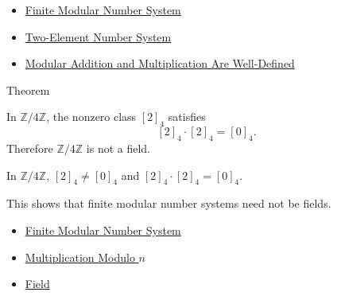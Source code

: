 \begin{dependencies}
\begin{itemize}
  \item \hyperref[def:finite-modular-number-system]{Finite Modular Number System}
  \item \hyperref[def:two-element-number-system]{Two-Element Number System}
  \item \hyperref[thm:modular-operations-well-defined]{Modular Addition and Multiplication Are Well-Defined}
\end{itemize}
\end{dependencies}

\begin{theorembox}{Theorem}
\begin{theorem}
\label{thm:z-mod-four-has-zero-divisors}
In \(\mathbb{Z}/4\mathbb{Z}\), the nonzero class \([2]_4\) satisfies
\[
[2]_4\cdot[2]_4=[0]_4.
\]
Therefore \(\mathbb{Z}/4\mathbb{Z}\) is not a field.
\end{theorem}

\begin{remark*}
In \(\mathbb{Z}/4\mathbb{Z}\), \([2]_4\neq[0]_4\) and
\([2]_4\cdot[2]_4=[0]_4\).
\end{remark*}

\begin{remark*}[Interpretation]
This shows that finite modular number systems need not be fields.
\end{remark*}
\end{theorembox}

\begin{dependencies}
\begin{itemize}
  \item \hyperref[def:finite-modular-number-system]{Finite Modular Number System}
  \item \hyperref[def:multiplication-modulo-n]{Multiplication Modulo \(n\)}
  \item \hyperref[def:abstract-field]{Field}
\end{itemize}
\end{dependencies}
